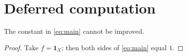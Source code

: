 
\section{Deferred computation}
\label{app:deferred}

\begin{lemma}
\label{lem:app}
The constant in \cref{eq:main} cannot be improved.
\end{lemma}

\begin{proof}
Take $f = \mathbf{1}_X$; then both sides of \cref{eq:main} equal $1$.
\end{proof}
